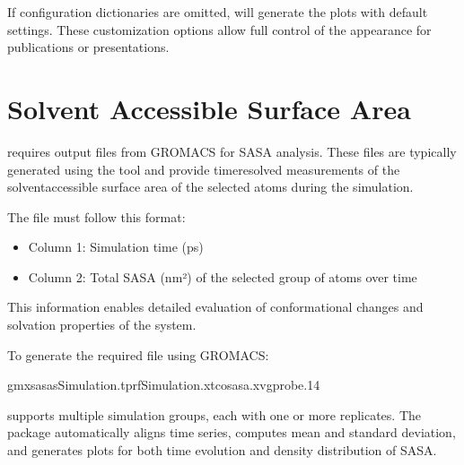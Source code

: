 \documentclass[a4paper,10pt,english]{sphinxmanual}
\begin{document}
\begin{sphinxVerbatim}[commandchars=\\\{\}]
 
\end{sphinxVerbatim}

\sphinxAtStartPar
If configuration dictionaries are omitted,  will generate the plots with default settings. These customization options allow full control of the appearance for publications or presentations.


\section{Solvent Accessible Surface Area}
\label{\detokenize{Input:solvent-accessible-surface-area}}
\sphinxAtStartPar
{} requires  output files from GROMACS for SASA analysis. These files are typically generated using the  tool and provide time\sphinxhyphen{}resolved measurements of the solvent\sphinxhyphen{}accessible surface area of the selected atoms during the simulation.

\sphinxAtStartPar
The  file must follow this format:
\begin{itemize}
\item {} 
\sphinxAtStartPar
Column 1: Simulation time (ps)

\item {} 
\sphinxAtStartPar
Column 2: Total SASA (nm²) of the selected group of atoms over time

\end{itemize}

\sphinxAtStartPar
This information enables detailed evaluation of conformational changes and solvation properties of the system.

\sphinxAtStartPar
To generate the required  file using GROMACS:

\begin{sphinxVerbatim}[commandchars=\\\{\}]
gmxsasa\PYGZhy{}sSimulation.tpr\PYGZhy{}fSimulation.xtc\PYGZhy{}osasa.xvg\PYGZhy{}probe.14
\end{sphinxVerbatim}

\sphinxAtStartPar
{} supports multiple simulation groups, each with one or more replicates. The package automatically aligns time series, computes mean and standard deviation, and generates plots for both time evolution and density distribution of SASA.
\end{document}
